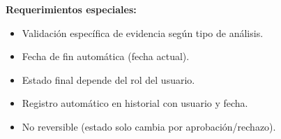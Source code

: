 \vspace{0.5em}
\noindent\textbf{Requerimientos especiales:}
\begin{itemize}[nosep]
    \item Validación específica de evidencia según tipo de análisis.
    \item Fecha de fin automática (fecha actual).
    \item Estado final depende del rol del usuario.
    \item Registro automático en historial con usuario y fecha.
    \item No reversible (estado solo cambia por aprobación/rechazo).
\end{itemize}
